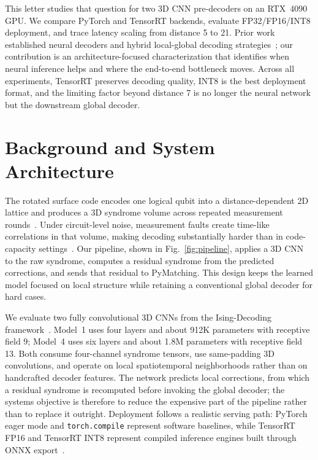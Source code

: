 \documentclass[journal]{IEEEtran}
\begin{document}
This letter studies that question for two 3D CNN pre-decoders on an RTX~4090 GPU. We compare PyTorch and TensorRT backends, evaluate FP32/FP16/INT8 deployment, and trace latency scaling from distance 5 to 21. Prior work established neural decoders and hybrid local-global decoding strategies~\cite{torlai2017neural,chamberland2023techniques}; our contribution is an architecture-focused characterization that identifies when neural inference helps and where the end-to-end bottleneck moves. Across all experiments, TensorRT preserves decoding quality, INT8 is the best deployment format, and the limiting factor beyond distance 7 is no longer the neural network but the downstream global decoder.

\section{Background and System Architecture}

The rotated surface code encodes one logical qubit into a distance-dependent 2D lattice and produces a 3D syndrome volume across repeated measurement rounds~\cite{fowler2012surface}. Under circuit-level noise, measurement faults create time-like correlations in that volume, making decoding substantially harder than in code-capacity settings~\cite{dennis2002topological}. Our pipeline, shown in Fig.~\ref{fig:pipeline}, applies a 3D CNN to the raw syndrome, computes a residual syndrome from the predicted corrections, and sends that residual to PyMatching. This design keeps the learned model focused on local structure while retaining a conventional global decoder for hard cases.

We evaluate two fully convolutional 3D CNNs from the Ising-Decoding framework~\cite{nvidia2026predecoder}. Model~1 uses four layers and about 912K parameters with receptive field 9; Model~4 uses six layers and about 1.8M parameters with receptive field 13. Both consume four-channel syndrome tensors, use same-padding 3D convolutions, and operate on local spatiotemporal neighborhoods rather than on handcrafted decoder features. The network predicts local corrections, from which a residual syndrome is recomputed before invoking the global decoder; the systems objective is therefore to reduce the expensive part of the pipeline rather than to replace it outright. Deployment follows a realistic serving path: PyTorch eager mode and \texttt{torch.compile} represent software baselines, while TensorRT FP16 and TensorRT INT8 represent compiled inference engines built through ONNX export~\cite{tensorrt}.
\end{document}
